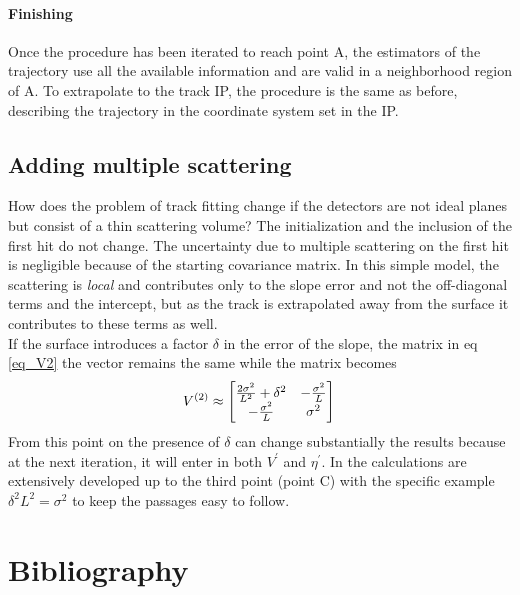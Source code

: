 \begin{refsection}
\paragraph{Finishing} Once the procedure has been iterated  to reach point A, 
the estimators of the trajectory use all the available information and are valid in a neighborhood region of A. 
To extrapolate to the track IP, 
the procedure is the same as before, 
describing the trajectory in the coordinate system set in the IP. 

\subsection{Adding multiple scattering}
How does the problem of track fitting change if the detectors are not ideal planes but consist of a thin scattering volume? 
The initialization and the inclusion of the first hit do not change. 
The uncertainty due to multiple scattering on the first hit is negligible because of the starting covariance matrix. 
In this simple model, the scattering is \textit{local} and contributes only to the slope error and not the off-diagonal terms 
and the intercept, but as the track is extrapolated away from the surface it contributes to these terms as well.\\
If the surface introduces a factor $\delta$ in the error of the slope, 
the matrix in eq \ref{eq_V2} the vector remains the same while the matrix becomes
$$
V^{(2)}\approx
\begin{bmatrix}
\frac{2\sigma^2}{L^2}+\delta^2 & -\frac{\sigma^2}{L} \\
-\frac{\sigma^2}{L} & \sigma^2
\end{bmatrix}\\
$$
From this point on the presence of $\delta$ can change substantially the results because at the next iteration, it will enter in both $V^\prime$ and $\eta^\prime$.
 In \cite{KutschkePaper} the calculations are extensively developed up to the third point (point C) 
 with the specific example $\delta^2L^2=\sigma^2$ to keep the passages easy to follow.

\section*{Bibliography}
\printbibliography[heading=none]
\end{refsection}
